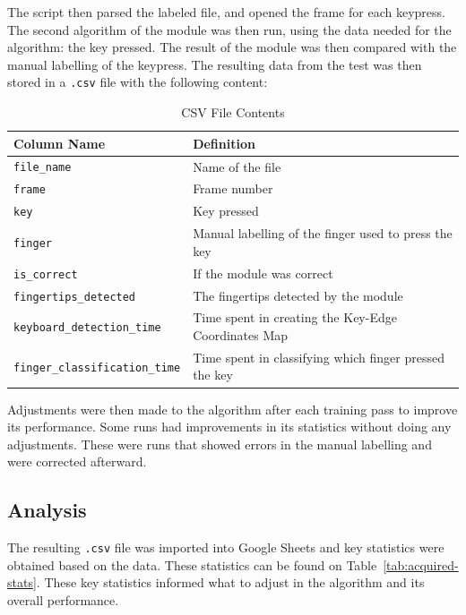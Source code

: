 \documentclass{report}
\begin{document}
The script then parsed the labeled file, and opened the frame for each keypress.
The second algorithm of the module was then run, using the data needed for the
algorithm: the key pressed. The result of the module was then compared with the
manual labelling of the keypress. The resulting data from the test was then
stored in a \texttt{.csv} file with the following content:

\begin{table}[H]
	\small
	\centering
	\begin{tabular}{ p{} p{} }
		\toprule
		Column Name                           & Definition                                             \\
		\midrule
		\texttt{file\_name}                   & Name of the file                                       \\
		\texttt{frame}                        & Frame number                                           \\
		\texttt{key}                          & Key pressed                                            \\
		\texttt{finger}                       & Manual labelling of the finger used to press the key   \\
		\texttt{is\_correct}                  & If the module was correct                              \\
		\texttt{fingertips\_detected}         & The fingertips detected by the module                  \\
		\texttt{keyboard\_detection\_time}    & Time spent in creating the Key-Edge Coordinates Map    \\
		\texttt{finger\_classification\_time} & Time spent in classifying which finger pressed the key \\
		\bottomrule
	\end{tabular}
	\caption{\label{tab:csv-output}CSV File Contents}
\end{table}

Adjustments were then made to the algorithm after each training pass to improve
its performance. Some runs had improvements in its statistics without doing any
adjustments. These were runs that showed errors in the manual labelling and
were corrected afterward.

\subsection{Analysis}
The resulting \texttt{.csv} file was imported into Google Sheets and key
statistics were obtained based on the data. These statistics can be found on
Table~\ref{tab:acquired-stats}. These key statistics informed what to adjust in
the algorithm and its overall performance.
\end{document}
